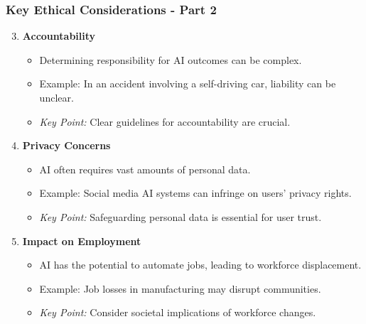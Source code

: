 \documentclass[aspectratio=169]{beamer}
\begin{document}
\begin{frame}[fragile]
    \frametitle{Key Ethical Considerations - Part 2}
    \begin{enumerate}
        \setcounter{enumi}{2} %
        \item \textbf{Accountability}
        \begin{itemize}
            \item Determining responsibility for AI outcomes can be complex.
            \item Example: In an accident involving a self-driving car, liability can be unclear.
            \item \textit{Key Point:} Clear guidelines for accountability are crucial.
        \end{itemize}
        
        \item \textbf{Privacy Concerns}
        \begin{itemize}
            \item AI often requires vast amounts of personal data.
            \item Example: Social media AI systems can infringe on users’ privacy rights.
            \item \textit{Key Point:} Safeguarding personal data is essential for user trust.
        \end{itemize}

        \item \textbf{Impact on Employment}
        \begin{itemize}
            \item AI has the potential to automate jobs, leading to workforce displacement.
            \item Example: Job losses in manufacturing may disrupt communities.
            \item \textit{Key Point:} Consider societal implications of workforce changes.
        \end{itemize}
    \end{enumerate}
\end{frame}
\end{document}

